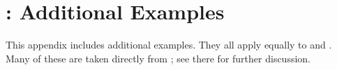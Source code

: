 \section{\PwTmcaTITLE{}: Additional Examples}
\label{sec:extras}

This appendix includes additional examples.  They all apply equally to
 and .  Many of these are taken directly from
\cite{DBLP:journals/pacmpl/JagadeesanJR20}; see there for further discussion.

